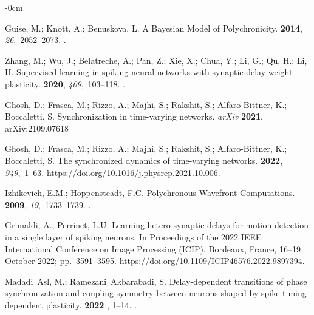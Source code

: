 \documentclass[brainsci, %
               review,accept,pdftex,moreauthors
               ]{Definitions/mdpi}
\begin{document}
\begin{adjustwidth}{-\extralength}{0cm}
\begin{thebibliography}{999}
Guise, M.; Knott, A.; Benuskova, L.
\newblock A {Bayesian} {Model} of {Polychronicity}.
 {\bf 2014}, {\em 26},~2052--2073.
.

Zhang, M.; Wu, J.; Belatreche, A.; Pan, Z.; Xie, X.; Chua, Y.; Li, G.; Qu, H.;
  Li, H.
\newblock Supervised learning in spiking neural networks with synaptic
  delay-weight plasticity.
 {\bf 2020}, {\em 409},~103--118.
.

Ghosh, D.; Frasca, M.; Rizzo, A.; Majhi, S.; Rakshit, S.; Alfaro-Bittner, K.;
  Boccaletti, S.
\newblock Synchronization in time-varying networks. \emph{arXiv} {\bf 2021}, arXiv:2109.07618

Ghosh, D.; Frasca, M.; Rizzo, A.; Majhi, S.; Rakshit, S.; Alfaro-Bittner, K.;
  Boccaletti, S.
\newblock The synchronized dynamics of time-varying networks.
 {\bf 2022}, {\em 949},~1--63.
  {{https://doi.org/10.1016/j.physrep.2021.10.006}}.

Izhikevich, E.M.; Hoppensteadt, F.C.
\newblock Polychronous {Wavefront} {Computations}.
 {\bf 2009}, {\em
  19},~1733--1739.
.

Grimaldi, A.; Perrinet, L.U.
\newblock Learning hetero-synaptic delays for motion detection in a single
  layer of spiking neurons.
\newblock In Proceedings of the 2022 {IEEE} {International} {Conference} on
  {Image} {Processing} ({ICIP}), {Bordeaux, France, 16--19 October} %
 2022; pp.~3591--3595.
  {{https://doi.org/10.1109/ICIP46576.2022.9897394}}.

Madadi~Asl, M.; Ramezani~Akbarabadi, S.
\newblock Delay-dependent transitions of phase synchronization and coupling
  symmetry between neurons shaped by spike-timing-dependent plasticity.
 {\bf {2022} %
}, 1--14.
.


\end{thebibliography}
\end{adjustwidth}
\end{document}
